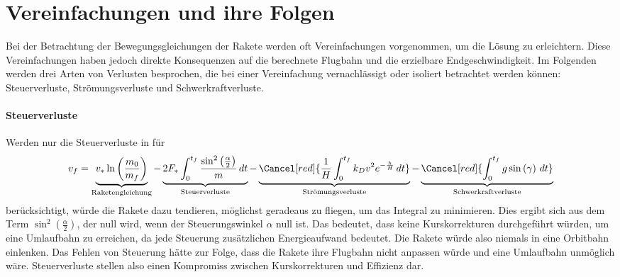 %
%
%
%

\section{Vereinfachungen und ihre Folgen 
	\label{leo:section:vereinfachungen}}

Bei der Betrachtung der Bewegungsgleichungen der Rakete werden oft Vereinfachungen vorgenommen, um die Lösung zu erleichtern. 
Diese Vereinfachungen haben jedoch direkte Konsequenzen auf die berechnete Flugbahn und die erzielbare Endgeschwindigkeit. 
Im Folgenden werden drei Arten von Verlusten besprochen, die bei einer Vereinfachung vernachlässigt oder isoliert betrachtet werden können: Steuerverluste, Strömungsverluste und Schwerkraftverluste.


\paragraph{Steuerverluste} Werden nur die Steuerverluste in für 
\begin{equation*}
	v_f = \underbrace{v_* \ln \left(\frac{m_0}{m_f}\right)}_{\text{Raketengleichung}} 
	- \underbrace{2F_* \int_0^{t_f} \frac{\sin^2\left(\frac{\alpha}{2}\right)}{m} \, dt }_{\text{Steuerverluste}}
	- \underbrace{\Cancel[red]{\frac{1}{H} \int_0^{t_f} k_Dv^2 e^{-\frac{h}{H}} \, dt }}_{\text{Strömungsverluste}}
	- \underbrace{\Cancel[red]{\int_0^{t_f} g \sin \left(\gamma\right) \, dt}}_{\text{Schwerkraftverluste}}
\end{equation*}
berücksichtigt, würde die Rakete dazu tendieren, möglichst geradeaus zu fliegen, um das Integral zu minimieren. 
Dies ergibt sich aus dem Term $\sin^2\left( \frac{\alpha}{2}\right)$, der null wird, wenn der Steuerungswinkel $\alpha$ null ist. 
Das bedeutet, dass keine Kurskorrekturen durchgeführt würden, um eine Umlaufbahn zu erreichen, da jede Steuerung zusätzlichen Energieaufwand bedeutet. 
Die Rakete würde also niemals in eine Orbitbahn einlenken.
Das Fehlen von Steuerung hätte zur Folge, dass die Rakete ihre Flugbahn nicht anpassen würde und eine Umlaufbahn unmöglich wäre. 
Steuerverluste stellen also einen Kompromiss zwischen Kurskorrekturen und Effizienz dar.

